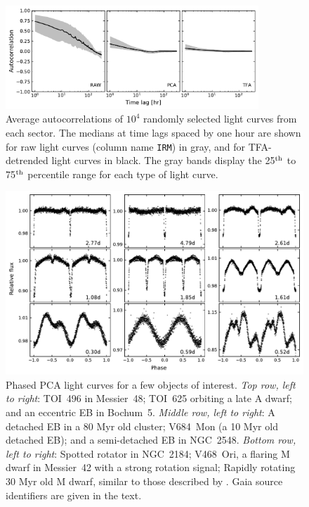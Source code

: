 \documentclass[12pt,twocolumn,tighten,trackchanges]{aastex62}
\begin{document}
\begin{figure}[!t]
	\begin{center}
		\leavevmode
		\includegraphics[width=0.85\textwidth]{avg_acf.pdf}
	\end{center}
	\vspace{-0.7cm}
  \caption{
    Average autocorrelations of $10^4$ randomly selected light curves
    from each sector.  The medians at time lags spaced by one hour are
    shown for raw light curves (column name \texttt{IRM}) in gray, and
    for TFA-detrended light curves in black.  The gray bands display
    the 25$^{\rm th}$ to 75$^{\rm th}$ percentile range for each type
    of light curve.
  \label{fig:avg_acf}
	}
\end{figure}

\begin{figure}[!t]
	\begin{center}
		\leavevmode
		\includegraphics[width=1\textwidth]{quilt_s6_s7.pdf}
	\end{center}
	\vspace{-0.8cm}
	\caption{
		Phased PCA light curves for a few objects of interest.
		{\it Top row, left to right}:
    TOI~496 in Messier~48; TOI~625 orbiting a late A dwarf; and an
    eccentric EB in Bochum~5.
		{\it Middle row, left to right}:
    A detached EB in a 80 Myr old cluster; V684~Mon (a 10 Myr old
    detached EB); and a semi-detached EB in NGC~2548.
		{\it Bottom row, left to right}:
    Spotted rotator in NGC~2184; V468~Ori, a flaring M dwarf in
    Messier~42 with a strong rotation signal; Rapidly rotating 30 Myr
    old M dwarf, similar to those described by
    \citet{zhan_complex_2019}.  Gaia source identifiers are given in
    the text.
	\label{fig:quilt}
	}
\end{figure}
\end{document}
